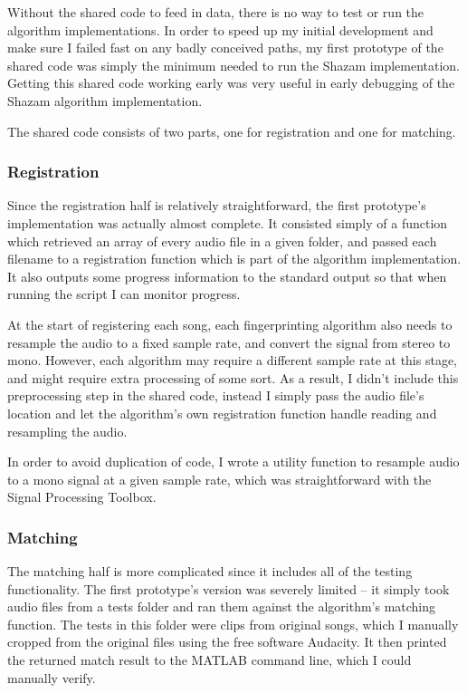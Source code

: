 \documentclass[12pt,a4paper,twoside,openright]{report}
\begin{document}
Without the shared code to feed in data, there is no way to test or run the algorithm implementations. In order to speed up my initial development and make sure I failed fast on any badly conceived paths, my first prototype of the shared code was simply the minimum needed to run the Shazam implementation. Getting this shared code working early was very useful in early debugging of the Shazam algorithm implementation.

The shared code consists of two parts, one for registration and one for matching. 

\subsubsection{Registration}

Since the registration half is relatively straightforward, the first prototype's implementation was actually almost complete. It consisted simply of a function which retrieved an array of every audio file in a given folder, and passed each filename to a registration function which is part of the algorithm implementation. It also outputs some progress information to the standard output so that when running the script I can monitor progress.

At the start of registering each song, each fingerprinting algorithm also needs to resample the audio to a fixed sample rate, and convert the signal from stereo to mono. However, each algorithm may require a different sample rate at this stage, and might require extra processing of some sort. As a result, I didn't include this preprocessing step in the shared code, instead I simply pass the audio file's location and let the algorithm's own registration function handle reading and resampling the audio.

In order to avoid duplication of code, I wrote a utility function to resample audio to a mono signal at a given sample rate, which was straightforward with the Signal Processing Toolbox.

\subsubsection{Matching}

The matching half is more complicated since it includes all of the testing functionality. The first prototype's version was severely limited -- it simply took audio files from a tests folder and ran them against the algorithm's matching function. The tests in this folder were clips from original songs, which I manually cropped from the original files using the free software Audacity. It then printed the returned match result to the MATLAB command line, which I could manually verify.
\end{document}
